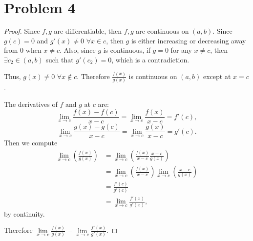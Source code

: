 \documentclass{article}
\begin{document}
\section*{Problem 4}
\begin{proof}
	Since $f, g$ are differentiable, then $f, g$ are continuous on $(a, b)$. Since $g(c) = 0$ and $g'(x) \neq 0$ $\forall x \in c$, then $g$ is either increasing or decreasing away from $0$ when $x \neq c$. Also, since $g$ is continuous, if $g=0$ for any $x \neq c$, then $\exists c_2 \in (a, b)$ such that $g'(c_2) = 0$, which is a contradiction.
	
	Thus, $g(x) \neq 0$ $\forall x \notin c$. Therefore $\frac{f(x)}{g(x)}$ is continuous on $(a, b)$ except at $x = c$.
	
	The derivatives of $f$ and $g$ at $c$ are: 
	\begin{equation}
		\lim\limits_{x \to c} \frac{f(x) - f(c)}{x - c} = \lim\limits_{x \to c} \frac{f(x)}{x - c} = f'(c),
	\end{equation}
	\begin{equation}
		\lim\limits_{x \to c} \frac{g(x) - g(c)}{x - c} = \lim\limits_{x \to c} \frac{g(x)}{x - c} = g'(c).
	\end{equation}
	Then we compute
	\begin{align}
		\lim\limits_{x \to c} \left(\frac{f(x)}{g(x)}\right) &= \lim\limits_{x \to c} \left(\frac{f(x)}{x - c} \frac{x-c}{g(x)}\right) \\
		&= \lim\limits_{x \to c} \left(\frac{f(x)}{x - c}\right) \lim\limits_{x \to c} \left(\frac{x - c}{g(x)}\right) \\
		&= \frac{f'(c)}{g'(c)} \\
		&= \lim\limits_{x \to c}\frac{f'(x)}{g'(x)},
	\end{align}
	by continuity. 
	
	Therefore $\lim \limits_{x \to c} \frac{f(x)}{g(x)} = \lim\limits_{x \to c} \frac{f'(x)}{g'(x)}$.
\end{proof}
\end{document}
